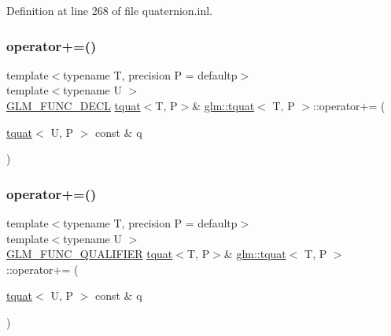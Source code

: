 Definition at line 268 of file quaternion.\+inl.

\mbox{\label{structglm_1_1tquat_a6a659798636ad7f9d8cb392904b61020}} 
\subsubsection{\texorpdfstring{operator+=()}{operator+=()}\hspace{0.1cm}{\footnotesize\ttfamily [1/2]}}
{\footnotesize\ttfamily template$<$typename T, precision P = defaultp$>$ \\
template$<$typename U $>$ \\
\mbox{\hyperlink{setup_8hpp_ab2d052de21a70539923e9bcbf6e83a51}{G\+L\+M\+\_\+\+F\+U\+N\+C\+\_\+\+D\+E\+CL}} \mbox{\hyperlink{structglm_1_1tquat}{tquat}}$<$T, P$>$\& \mbox{\hyperlink{structglm_1_1tquat}{glm\+::tquat}}$<$ T, P $>$\+::operator+= (\begin{DoxyParamCaption}\item[{\mbox{\hyperlink{structglm_1_1tquat}{tquat}}$<$ U, P $>$ const \&}]{q }\end{DoxyParamCaption})}

\mbox{\label{structglm_1_1tquat_a90b089779296e6f39f7aa9cddaf3ce83}} 
\subsubsection{\texorpdfstring{operator+=()}{operator+=()}\hspace{0.1cm}{\footnotesize\ttfamily [2/2]}}
{\footnotesize\ttfamily template$<$typename T, precision P = defaultp$>$ \\
template$<$typename U $>$ \\
\mbox{\hyperlink{setup_8hpp_a33fdea6f91c5f834105f7415e2a64407}{G\+L\+M\+\_\+\+F\+U\+N\+C\+\_\+\+Q\+U\+A\+L\+I\+F\+I\+ER}} \mbox{\hyperlink{structglm_1_1tquat}{tquat}}$<$T, P$>$\& \mbox{\hyperlink{structglm_1_1tquat}{glm\+::tquat}}$<$ T, P $>$\+::operator+= (\begin{DoxyParamCaption}\item[{\mbox{\hyperlink{structglm_1_1tquat}{tquat}}$<$ U, P $>$ const \&}]{q }\end{DoxyParamCaption})}



